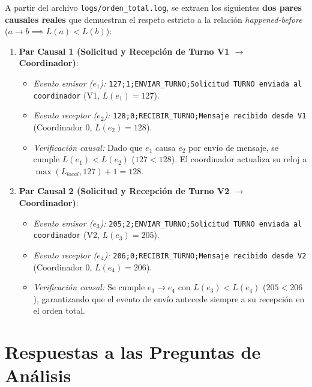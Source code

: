 \documentclass[10pt,a4paper]{article}
\begin{document}
A partir del archivo \texttt{logs/orden\_total.log}, se extraen los siguientes \textbf{dos pares causales reales} que demuestran el respeto estricto a la relación \textit{happened-before} ($a \to b \implies L(a) < L(b)$):
\begin{enumerate}\setlength{\itemsep}{1pt}\setlength{\parskip}{0pt}\setlength{\parsep}{0pt}
    \item \textbf{Par Causal 1 (Solicitud y Recepción de Turno V1 $\to$ Coordinador)}:
    \begin{itemize}\setlength{\itemsep}{0pt}\setlength{\parskip}{0pt}
        \item \textit{Evento emisor ($e_1$):} \texttt{127;1;ENVIAR\_TURNO;Solicitud TURNO enviada al coordinador} (V1, $L(e_1) = 127$).
        \item \textit{Evento receptor ($e_2$):} \texttt{128;0;RECIBIR\_TURNO;Mensaje recibido desde V1} (Coordinador 0, $L(e_2) = 128$).
        \item \textit{Verificación causal:} Dado que $e_1$ causa $e_2$ por envío de mensaje, se cumple $L(e_1) < L(e_2)$ ($127 < 128$). El coordinador actualiza su reloj a $\max(L_{local}, 127) + 1 = 128$.
    \end{itemize}
    \item \textbf{Par Causal 2 (Solicitud y Recepción de Turno V2 $\to$ Coordinador)}:
    \begin{itemize}\setlength{\itemsep}{0pt}\setlength{\parskip}{0pt}
        \item \textit{Evento emisor ($e_3$):} \texttt{205;2;ENVIAR\_TURNO;Solicitud TURNO enviada al coordinador} (V2, $L(e_3) = 205$).
        \item \textit{Evento receptor ($e_4$):} \texttt{206;0;RECIBIR\_TURNO;Mensaje recibido desde V2} (Coordinador 0, $L(e_4) = 206$).
        \item \textit{Verificación causal:} Se cumple $e_3 \to e_4$ con $L(e_3) < L(e_4)$ ($205 < 206$), garantizando que el evento de envío antecede siempre a su recepción en el orden total.
    \end{itemize}
\end{enumerate}

\section{Respuestas a las Preguntas de Análisis}
\end{document}
